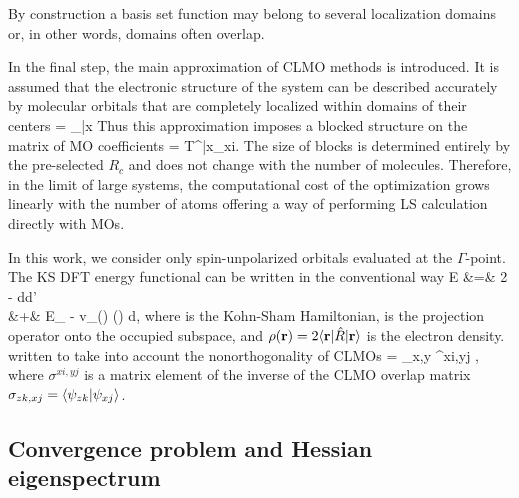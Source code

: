 \documentclass[10pt,amsmath,twocolumn,aps,prl,superscriptaddress,floatfix]{revtex4-1}
\begin{document}
By construction a basis set function may belong to several localization domains or, in other words, domains often overlap. 

In the final step, the main approximation of CLMO methods is introduced. It is assumed that the electronic structure of the system can be described accurately by molecular orbitals that are completely localized within domains of their centers
%
\bea
{} = _{\bar{x}} 
\label{eq:LMO}
\eea
%
Thus this approximation imposes a blocked structure on the matrix of MO coefficients
\bea
{} =  {T^{\bar{x}\mu}}_{xi}.
\label{eq:LMOproj}
\eea
%
The size of blocks is determined entirely by the pre-selected $R_{c}$ and does not change with the number of molecules. Therefore, in the limit of large systems, the computational cost of the optimization grows linearly with the number of atoms offering a way of performing LS calculation directly with MOs. %

In this work, we consider only spin-unpolarized orbitals evaluated at the $\Gamma$-point. The KS DFT energy functional can be written in the conventional way 
\bea
E &=& 2 \trace \left[ \op{R} \op{H} \right] -  \int\int {}d\br d\br' \nonumber \\
 &+& E_{} - \int v_{}(\br) \rho(\br) d\br,
\eea
%
where  is the Kohn-Sham Hamiltonian,  is the projection operator onto the occupied subspace, and $\rho(\mathbf{r}) = 2\langle \mathbf{r} \vert\hat{R}\vert \mathbf{r} \rangle$ is the electron density.  written to take into account the nonorthogonality of CLMOs
\bea \label{eq:dm}
 = \sum_{x,y}  \sigma^{xi,yj} ,
\eea
%
where $\sigma^{xi,yj}$ is a matrix element of the inverse of the CLMO overlap matrix $\sigma_{zk,xj} = \langle  \psi_{zk} \vert  \psi_{xj} \rangle $.

\subsection{Convergence problem and Hessian eigenspectrum}
\end{document}
